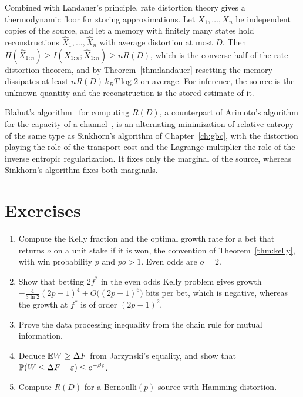 Combined with Landauer's principle, rate distortion theory gives a thermodynamic floor for storing approximations. Let $X_1,\dots,X_n$ be independent copies of the source, and let a memory with finitely many states hold reconstructions $\hat X_1,\dots,\hat X_n$ with average distortion at most $D$. Then $H(\hat X_{1:n})\geq I(X_{1:n};\hat X_{1:n})\geq nR(D)$, which is the converse half of the rate distortion theorem, and by Theorem~\ref{thm:landauer} resetting the memory dissipates at least $nR(D)\,k_BT\log2$ on average. For inference, the source is the unknown quantity and the reconstruction is the stored estimate of it.

Blahut's algorithm~\cite{blahut1972} for computing $R(D)$, a counterpart of Arimoto's algorithm for the capacity of a channel~\cite{arimoto1972}, is an alternating minimization of relative entropy of the same type as Sinkhorn's algorithm of Chapter~\ref{ch:gbc}, with the distortion playing the role of the transport cost and the Lagrange multiplier the role of the inverse entropic regularization. It fixes only the marginal of the source, whereas Sinkhorn's algorithm fixes both marginals.

\section*{Exercises}
\begin{enumerate}
\item Compute the Kelly fraction and the optimal growth rate for a bet that returns $o$ on a unit stake if it is won, the convention of Theorem~\ref{thm:kelly}, with win probability $p$ and $po>1$. Even odds are $o = 2$.
\item Show that betting $2f^*$ in the even odds Kelly problem gives growth $-\frac{4}{3\ln2}(2p-1)^4+O\big((2p-1)^6\big)$ bits per bet, which is negative, whereas the growth at $f^*$ is of order $(2p-1)^2$.
\item Prove the data processing inequality from the chain rule for mutual information.
\item Deduce $\E W\geq\Delta F$ from Jarzynski's equality, and show that $\P(W\leq\Delta F-\varepsilon)\leq e^{-\beta\varepsilon}$.
\item Compute $R(D)$ for a Bernoulli$(p)$ source with Hamming distortion.
\end{enumerate}
